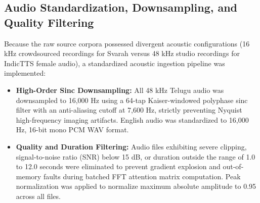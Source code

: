 \documentclass[11pt,a4paper]{article}
\begin{document}
\subsection{Audio Standardization, Downsampling, and Quality Filtering}
Because the raw source corpora possessed divergent acoustic configurations (16 kHz crowdsourced recordings for Svarah versus 48 kHz studio recordings for IndicTTS female audio), a standardized acoustic ingestion pipeline was implemented:
\begin{itemize}
    \item \textbf{High-Order Sinc Downsampling:} All 48 kHz Telugu audio was downsampled to 16,000 Hz using a 64-tap Kaiser-windowed polyphase sinc filter with an anti-aliasing cutoff at 7,600 Hz, strictly preventing Nyquist high-frequency imaging artifacts. English audio was standardized to 16,000 Hz, 16-bit mono PCM WAV format.
    \item \textbf{Quality and Duration Filtering:} Audio files exhibiting severe clipping, signal-to-noise ratio (SNR) below 15 dB, or duration outside the range of 1.0 to 12.0 seconds were eliminated to prevent gradient explosion and out-of-memory faults during batched FFT attention matrix computation. Peak normalization was applied to normalize maximum absolute amplitude to 0.95 across all files.
\end{itemize}
\end{document}
